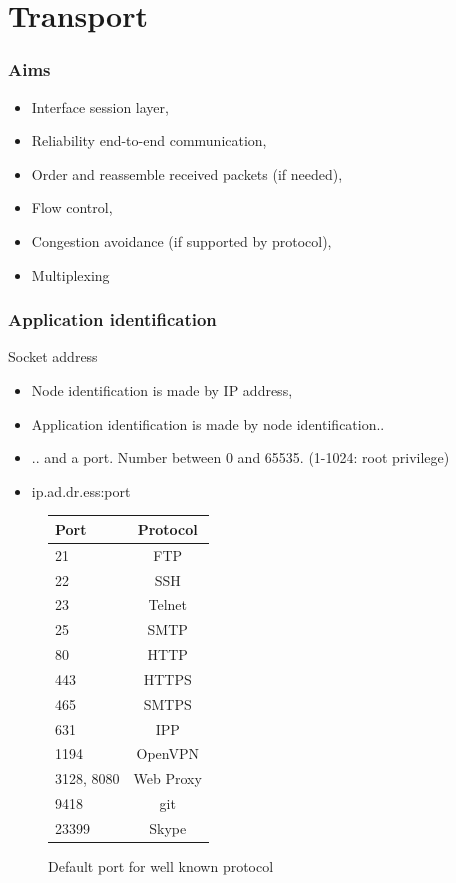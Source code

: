 \section{Transport}
  \begin{frame}
    \frametitle{Aims}
      \begin{itemize}
        \item Interface session layer,
        \item Reliability end-to-end communication,
        \item Order and reassemble received packets (if needed),
        \item Flow control,
        \item Congestion avoidance (if supported by protocol),
        \item Multiplexing
      \end{itemize}
  \end{frame}

  \begin{frame}
    \frametitle{Application identification}
    \begin{block}{Socket address}
      \begin{itemize}
        \item Node identification is made by IP address,
        \item Application identification is made by node identification..
        \item .. and a port. Number between 0 and 65535. (1-1024: root privilege)
        \item \begin{center} ip.ad.dr.ess:port \end{center}
      \end{itemize}
    \end{block}
  \end{frame}

  \begin{frame}
    \begin{figure}
      \centering
      \begin{tabular}{l|c}
        Port  & Protocol \\ \hline
        21    & FTP \\ \hline
        22    & SSH \\ \hline
        23    & Telnet \\ \hline
        25    & SMTP \\ \hline
        80    & HTTP \\ \hline
        443   & HTTPS \\ \hline
        465   & SMTPS \\ \hline
        631   & IPP \\ \hline
        1194  & OpenVPN \\ \hline
        3128, 8080 & Web Proxy \\ \hline
        9418  & git \\ \hline
        23399 & Skype \\ \hline
      \end{tabular}
      \caption{Default port for well known protocol}
      \label{fig:def-port}
    \end{figure}
  \end{frame}

